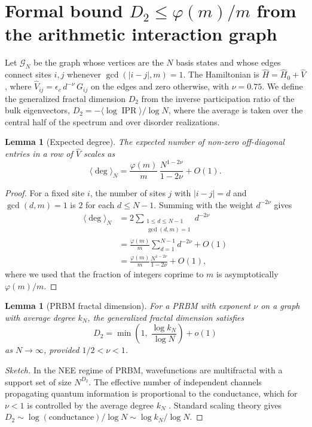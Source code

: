 \documentclass[aps,prl,preprint,superscriptaddress,floatfix]{revtex4-2}
\newtheorem{lemma}[theorem]{Lemma}
\DeclareMathOperator{\IPR}{IPR}
\begin{document}
\section{Formal bound \texorpdfstring{$D_2 \le \varphi(m)/m$}{D2 ≤ phi(m)/m} from the arithmetic interaction graph}
\label{app:bound}

Let $\mathcal{G}_N$ be the graph whose vertices are the $N$ basis states and whose edges connect sites $i,j$ whenever $\gcd(|i-j|,m)=1$. The Hamiltonian is $\hat H = \hat H_0 + \hat V$, where $\hat V_{ij} = \epsilon_c \, d^{-\nu} \, G_{ij}$ on the edges and zero otherwise, with $\nu=0.75$. We define the generalized fractal dimension $D_2$ from the inverse participation ratio of the bulk eigenvectors, $D_2 = -\langle\log \IPR\rangle / \log N$, where the average is taken over the central half of the spectrum and over disorder realizations.

\begin{lemma}[Expected degree]\label{lem:degree}
The expected number of non-zero off-diagonal entries in a row of $\hat V$ scales as
\begin{equation}
\langle \deg \rangle_N = \frac{\varphi(m)}{m} \, \frac{N^{1-2\nu}}{1-2\nu} + O(1).
\end{equation}
\end{lemma}
\begin{proof}
For a fixed site $i$, the number of sites $j$ with $|i-j|=d$ and $\gcd(d,m)=1$ is $2$ for each $d\le N-1$. Summing with the weight $d^{-2\nu}$ gives
\begin{align*}
\langle \deg \rangle_N &= 2\sum_{\substack{1\le d\le N-1 \\ \gcd(d,m)=1}} d^{-2\nu} \\
&= \frac{\varphi(m)}{m} \sum_{d=1}^{N-1} d^{-2\nu} + O(1) \\
&= \frac{\varphi(m)}{m} \frac{N^{1-2\nu}}{1-2\nu} + O(1),
\end{align*}
where we used that the fraction of integers coprime to $m$ is asymptotically $\varphi(m)/m$.
\end{proof}

\begin{lemma}[PRBM fractal dimension]\label{lem:prbm}
For a PRBM with exponent $\nu$ on a graph with average degree $k_N$, the generalized fractal dimension satisfies
\begin{equation}
D_2 = \min\!\left(1,\; \frac{\log k_N}{\log N}\right) + o(1)
\end{equation}
as $N\to\infty$, provided $1/2<\nu<1$.
\end{lemma}
\begin{proof}[Sketch]
In the NEE regime of PRBM, wavefunctions are multifractal with a support set of size $N^{D_2}$. The effective number of independent channels propagating quantum information is proportional to the conductance, which for $\nu<1$ is controlled by the average degree $k_N$ \cite{Mirlin1996}. Standard scaling theory gives $D_2 \sim \log(\text{conductance})/\log N \sim \log k_N / \log N$.
\end{proof}
\end{document}
